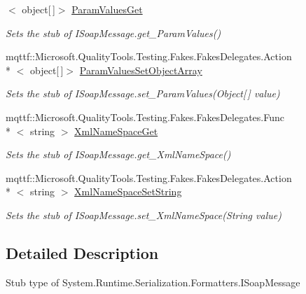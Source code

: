 \begin{DoxyCompactItemize}
$<$ object\mbox{[}$\,$\mbox{]}$>$ \hyperlink{class_system_1_1_runtime_1_1_serialization_1_1_formatters_1_1_fakes_1_1_stub_i_soap_message_a960fde6b4f8f5e71146ffc00449aea5a}{Param\-Values\-Get}
\begin{DoxyCompactList}\small\item\em Sets the stub of I\-Soap\-Message.\-get\-\_\-\-Param\-Values()\end{DoxyCompactList}\item 
mqttf\-::\-Microsoft.\-Quality\-Tools.\-Testing.\-Fakes.\-Fakes\-Delegates.\-Action\\*
$<$ object\mbox{[}$\,$\mbox{]}$>$ \hyperlink{class_system_1_1_runtime_1_1_serialization_1_1_formatters_1_1_fakes_1_1_stub_i_soap_message_a49f13142de20c9cede86ef0e1954d2f4}{Param\-Values\-Set\-Object\-Array}
\begin{DoxyCompactList}\small\item\em Sets the stub of I\-Soap\-Message.\-set\-\_\-\-Param\-Values(\-Object\mbox{[}$\,$\mbox{]} value)\end{DoxyCompactList}\item 
mqttf\-::\-Microsoft.\-Quality\-Tools.\-Testing.\-Fakes.\-Fakes\-Delegates.\-Func\\*
$<$ string $>$ \hyperlink{class_system_1_1_runtime_1_1_serialization_1_1_formatters_1_1_fakes_1_1_stub_i_soap_message_aef1f89c96eb699fe889004c1c59de73a}{Xml\-Name\-Space\-Get}
\begin{DoxyCompactList}\small\item\em Sets the stub of I\-Soap\-Message.\-get\-\_\-\-Xml\-Name\-Space()\end{DoxyCompactList}\item 
mqttf\-::\-Microsoft.\-Quality\-Tools.\-Testing.\-Fakes.\-Fakes\-Delegates.\-Action\\*
$<$ string $>$ \hyperlink{class_system_1_1_runtime_1_1_serialization_1_1_formatters_1_1_fakes_1_1_stub_i_soap_message_a7e0ea53e3f73a5e574f9a78a4709b856}{Xml\-Name\-Space\-Set\-String}
\begin{DoxyCompactList}\small\item\em Sets the stub of I\-Soap\-Message.\-set\-\_\-\-Xml\-Name\-Space(\-String value)\end{DoxyCompactList}\end{DoxyCompactItemize}


\subsection{Detailed Description}
Stub type of System.\-Runtime.\-Serialization.\-Formatters.\-I\-Soap\-Message



